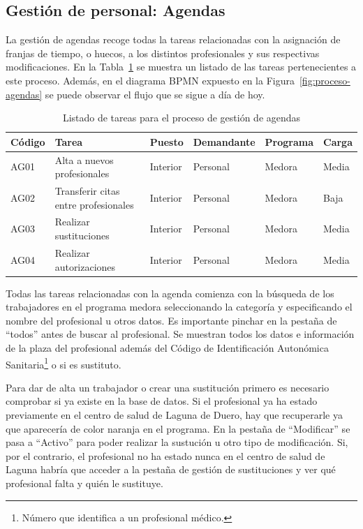\subsection{Gestión de personal: Agendas}

La gestión de agendas recoge todas la tareas  relacionadas con la asignación de franjas de tiempo, o huecos, a los distintos profesionales y sus respectivas modificaciones. En la Tabla~\ref{tab:proceso-agendas} se muestra un listado de las tareas pertenecientes a este proceso. Además, en el diagrama BPMN expuesto en la Figura~\ref{fig:proceso-agendas} se puede observar el flujo que se sigue a día de hoy.

\begin{table}[H]
    \begin{tabular}{@{}llllll@{}}
        \toprule
        Código & Tarea                                & Puesto   & Demandante & Programa & Carga \\
        \midrule
        AG01   & Alta a nuevos profesionales          & Interior & Personal   & Medora   & Media \\
        AG02   & Transferir citas entre profesionales & Interior & Personal   & Medora   & Baja  \\
        AG03   & Realizar sustituciones               & Interior & Personal   & Medora   & Media \\
        AG04   & Realizar autorizaciones              & Interior & Personal   & Medora   & Media \\
        \bottomrule
    \end{tabular}
    \caption{Listado de tareas para el proceso de gestión de agendas}
    \label{tab:proceso-agendas}
\end{table}

Todas las tareas relacionadas con la agenda comienza con la búsqueda de los trabajadores en el programa \Gls{medora} seleccionando la categoría y especificando el nombre del profesional u otros datos.
Es importante pinchar en la pestaña de ``todos'' antes de buscar al profesional.
Se muestran todos los datos e información de la plaza del profesional además del Código de Identificación Autonómica Sanitaria\footnote{Número que identifica a un profesional médico.} o si es sustituto.

Para dar de alta un trabajador o crear una sustitución primero es necesario comprobar si ya existe en la base de datos.
Si el profesional ya ha estado previamente en el centro de salud de Laguna de Duero, hay que recuperarle ya que aparecería de color naranja en el programa.
En la pestaña de ``Modificar'' se pasa a ``Activo'' para poder realizar la sustución u otro tipo de modificación.
Si, por el contrario, el profesional no ha estado nunca en el centro de salud de Laguna habría que acceder a la pestaña de gestión de sustituciones y ver qué profesional falta y quién le sustituye.

